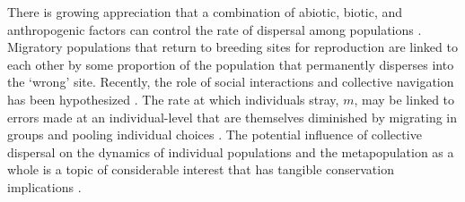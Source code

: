\documentclass{revtex4}
\begin{document}
There is growing appreciation that a combination of abiotic, biotic, and anthropogenic factors can control the rate of dispersal among populations \citep{H:2013fs,Keefer:2014gg,Bett:2017ha}.
Migratory populations that return to breeding sites for reproduction are linked to each other by some proportion of the population that permanently disperses into the `wrong' site. 
Recently, the role of social interactions and collective navigation has been hypothesized \citep[][This issue]{Berdahl:2015kv,Berdahl:2016dx}.
The rate at which individuals stray, $m$, may be linked to errors made at an individual-level that are themselves diminished by migrating in groups and pooling individual choices \citep{Simons:2004jo,Berdahl:2015kv,Berdahl:2016dx}.
The potential influence of collective dispersal on the dynamics of individual populations and the metapopulation as a whole is a topic of considerable interest that has tangible conservation implications \citep{Brenner:2012gl,Johnson:2012fe,Fullerton:2011ii}.



\end{document}
